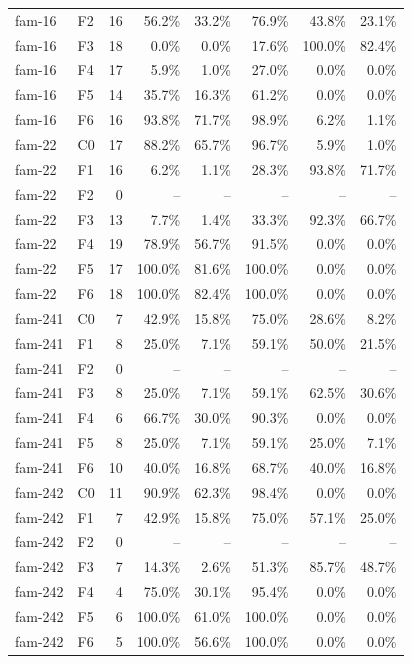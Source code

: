 \begin{tabular}{llrrrrrr}
fam-16 & F2 & 16 & 56.2\% & 33.2\% & 76.9\% & 43.8\% & 23.1\% \\
fam-16 & F3 & 18 & 0.0\% & 0.0\% & 17.6\% & 100.0\% & 82.4\% \\
fam-16 & F4 & 17 & 5.9\% & 1.0\% & 27.0\% & 0.0\% & 0.0\% \\
fam-16 & F5 & 14 & 35.7\% & 16.3\% & 61.2\% & 0.0\% & 0.0\% \\
fam-16 & F6 & 16 & 93.8\% & 71.7\% & 98.9\% & 6.2\% & 1.1\% \\
fam-22 & C0 & 17 & 88.2\% & 65.7\% & 96.7\% & 5.9\% & 1.0\% \\
fam-22 & F1 & 16 & 6.2\% & 1.1\% & 28.3\% & 93.8\% & 71.7\% \\
fam-22 & F2 & 0 & -- & -- & -- & -- & -- \\
fam-22 & F3 & 13 & 7.7\% & 1.4\% & 33.3\% & 92.3\% & 66.7\% \\
fam-22 & F4 & 19 & 78.9\% & 56.7\% & 91.5\% & 0.0\% & 0.0\% \\
fam-22 & F5 & 17 & 100.0\% & 81.6\% & 100.0\% & 0.0\% & 0.0\% \\
fam-22 & F6 & 18 & 100.0\% & 82.4\% & 100.0\% & 0.0\% & 0.0\% \\
fam-241 & C0 & 7 & 42.9\% & 15.8\% & 75.0\% & 28.6\% & 8.2\% \\
fam-241 & F1 & 8 & 25.0\% & 7.1\% & 59.1\% & 50.0\% & 21.5\% \\
fam-241 & F2 & 0 & -- & -- & -- & -- & -- \\
fam-241 & F3 & 8 & 25.0\% & 7.1\% & 59.1\% & 62.5\% & 30.6\% \\
fam-241 & F4 & 6 & 66.7\% & 30.0\% & 90.3\% & 0.0\% & 0.0\% \\
fam-241 & F5 & 8 & 25.0\% & 7.1\% & 59.1\% & 25.0\% & 7.1\% \\
fam-241 & F6 & 10 & 40.0\% & 16.8\% & 68.7\% & 40.0\% & 16.8\% \\
fam-242 & C0 & 11 & 90.9\% & 62.3\% & 98.4\% & 0.0\% & 0.0\% \\
fam-242 & F1 & 7 & 42.9\% & 15.8\% & 75.0\% & 57.1\% & 25.0\% \\
fam-242 & F2 & 0 & -- & -- & -- & -- & -- \\
fam-242 & F3 & 7 & 14.3\% & 2.6\% & 51.3\% & 85.7\% & 48.7\% \\
fam-242 & F4 & 4 & 75.0\% & 30.1\% & 95.4\% & 0.0\% & 0.0\% \\
fam-242 & F5 & 6 & 100.0\% & 61.0\% & 100.0\% & 0.0\% & 0.0\% \\
fam-242 & F6 & 5 & 100.0\% & 56.6\% & 100.0\% & 0.0\% & 0.0\% \\

\end{tabular}
